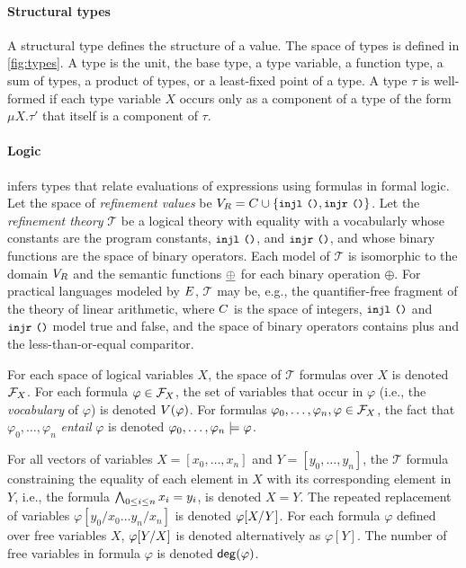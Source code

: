 \paragraph{Structural types}
%
A structural type defines the structure of a value.
%
The space of types is defined in \autoref{fig:types}.
%
A type is the unit, the base type, a type variable, a function type, a
sum of types, a product of types, or a least-fixed point of a type.
%
A type $\tau$ is well-formed if each type variable $X$ occurs only as
a component of a type of the form $\mu X. \tau'$ that itself is a
component of $\tau$.

\paragraph{Logic}
\sys infers types that relate evaluations of expressions using
formulas in formal logic.
%
Let the space of \emph{refinement values} be
$\fovals = \consts \union \elts{ \injl\ \unit, \injr\ \unit }$.
%
Let the \emph{refinement theory} $\mathcal{T}$ be a logical theory
with equality with a vocabularly whose constants are the program
constants, $\injl\ \unit$, and $\injr\ \unit$, and whose binary
functions are the space of binary operators.
%
Each model of $\mathcal{T}$ is isomorphic to the domain $\fovals$ and
the semantic functions $\interp{\oplus}$ for each binary operation
$\oplus$.
%
For practical languages modeled by $\expr$, $\mathcal{T}$ may be,
e.g., the quantifier-free fragment of the theory of linear arithmetic,
where $\consts$ is the space of integers, $\injl\ \unit$ and
$\injr\ \unit$ model true and false, and the space of binary operators
contains plus and the less-than-or-equal comparitor.

For each space of logical variables $X$, the space of $\mathcal{T}$
formulas over $X$ is denoted $\formulas{ X }$.
%
For each formula $\varphi \in \formulas{X}$, the set of variables that
occur in $\varphi$ (i.e., the \emph{vocabulary} of $\varphi$) is
denoted $\vocab(\varphi)$.
For formulas $\varphi_0, \ldots, \varphi_n, \varphi \in \formulas{X}$,
the fact that $\varphi_0, \ldots, \varphi_n$ \emph{entail} $\varphi$
is denoted $\varphi_0, \ldots, \varphi_n \entails \varphi$.

For all vectors of variables $X = [ x_0, \ldots, x_n ]$ and
$Y = [ y_0, \ldots, y_n ]$, the $\mathcal{T}$ formula constraining the
equality of each element in $X$ with its corresponding element in $Y$,
i.e., the formula $\bigland_{0 \leq i \leq n} x_i = y_i$, is denoted
$X = Y$.
%
The repeated replacement of variables $\varphi[ y_0 / x_0 \ldots y_{n}
/ x_{n} ]$ is denoted $\replace{\varphi}{Y}{X}$.
%
For each formula $\varphi$ defined over free variables $X$,
$\replace{\varphi}{X}{Y}$ is denoted alternatively as $\varphi[Y]$.
%
The number of free variables in formula $\varphi$ is denoted
$\degreeof(\varphi)$.

